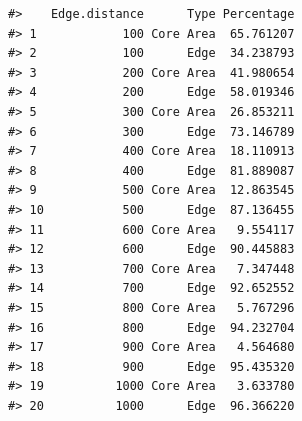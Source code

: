 \documentclass[
]{book}
\newenvironment{Shaded}{\begin{snugshade}}{\end{snugshade}}
\newcommand{\AttributeTok}[1]{\textcolor[rgb]{0.13,0.29,0.53}{#1}}
\newcommand{\CommentTok}[1]{\textcolor[rgb]{0.56,0.35,0.01}{\textit{#1}}}
\newcommand{\ConstantTok}[1]{\textcolor[rgb]{0.56,0.35,0.01}{#1}}
\newcommand{\ControlFlowTok}[1]{\textcolor[rgb]{0.13,0.29,0.53}{\textbf{#1}}}
\newcommand{\DecValTok}[1]{\textcolor[rgb]{0.00,0.00,0.81}{#1}}
\newcommand{\FloatTok}[1]{\textcolor[rgb]{0.00,0.00,0.81}{#1}}
\newcommand{\FunctionTok}[1]{\textcolor[rgb]{0.13,0.29,0.53}{\textbf{#1}}}
\newcommand{\NormalTok}[1]{#1}
\newcommand{\OtherTok}[1]{\textcolor[rgb]{0.56,0.35,0.01}{#1}}
\newcommand{\SpecialCharTok}[1]{\textcolor[rgb]{0.81,0.36,0.00}{\textbf{#1}}}
\newcommand{\StringTok}[1]{\textcolor[rgb]{0.31,0.60,0.02}{#1}}
\begin{document}
\begin{Shaded}
\end{Shaded}

\begin{verbatim}
#>    Edge.distance      Type Percentage
#> 1            100 Core Area  65.761207
#> 2            100      Edge  34.238793
#> 3            200 Core Area  41.980654
#> 4            200      Edge  58.019346
#> 5            300 Core Area  26.853211
#> 6            300      Edge  73.146789
#> 7            400 Core Area  18.110913
#> 8            400      Edge  81.889087
#> 9            500 Core Area  12.863545
#> 10           500      Edge  87.136455
#> 11           600 Core Area   9.554117
#> 12           600      Edge  90.445883
#> 13           700 Core Area   7.347448
#> 14           700      Edge  92.652552
#> 15           800 Core Area   5.767296
#> 16           800      Edge  94.232704
#> 17           900 Core Area   4.564680
#> 18           900      Edge  95.435320
#> 19          1000 Core Area   3.633780
#> 20          1000      Edge  96.366220
\end{verbatim}
\end{document}
